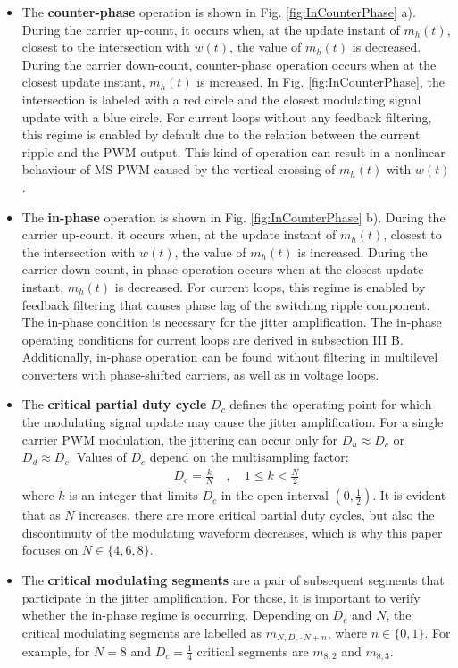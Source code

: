 \documentclass[journal]{IEEEtran}
\begin{document}
\noindent
\begin{itemize}
\item{The \textbf{counter-phase} operation is shown in Fig. \ref{fig:InCounterPhase} a). During the carrier up-count, it occurs when, at the update instant of $m_h(t)$, closest to the intersection with $w(t)$, the value of $m_h(t)$ is decreased. During the carrier down-count, counter-phase operation occurs when at the closest update instant, $m_h(t)$ is increased. In Fig. \ref{fig:InCounterPhase}, the intersection is labeled with a red circle and the closest modulating signal update with a blue circle. 
For current loops without any feedback filtering, this regime is enabled by default due to the relation between the current ripple and the PWM output. This kind of operation can result in a nonlinear behaviour of MS-PWM caused by the vertical crossing of $m_h(t)$ with $w(t)$.}

\item{The \textbf{in-phase} operation is shown in Fig. \ref{fig:InCounterPhase} b). During the carrier up-count, it occurs when, at the update instant of $m_h(t)$, closest to the intersection with $w(t)$, the value of $m_h(t)$ is increased. During the carrier down-count, in-phase operation occurs when at the closest update instant, $m_h(t)$ is decreased. For current loops, this regime is enabled by feedback filtering that causes phase lag of the switching ripple component. The in-phase condition is necessary for the jitter amplification. The in-phase operating conditions for current loops are derived in subsection III B. Additionally, in-phase operation can be found without filtering in multilevel converters with phase-shifted carriers, as well as in voltage loops.}

\item{The \textbf{critical partial duty cycle} $D_c$ defines the operating point for which the modulating signal update may cause the jitter amplification. 
For a single carrier PWM modulation, the jittering can occur only for $D_u \approx D_c$ or $D_d \approx D_c$. Values of $D_c$ depend on the multisampling factor:
\begin{equation}
\begin{aligned}
D_c = \frac{k}{N} \quad , \quad 1 \leq k < \frac{N}{2} \label{eq:duty_crit} 
\end{aligned}    
\end{equation}
where $k$ is an integer that limits $D_c$ in the open interval $\left(0,\frac{1}{2} \right)$. 
It is evident that as $N$ increases, there are more critical partial duty cycles, but also the discontinuity of the modulating waveform decreases, which is why this paper focuses on $N \in \{ 4,6,8 \}$.}

\item{The \textbf{critical modulating segments} are a pair of subsequent segments that participate in the jitter amplification. For those, it is important to verify whether the in-phase regime is occurring. Depending on $D_c$ and $N$, the critical modulating segments are labelled as $m_{N , D_c \cdot N + n}$, where $n \in \{ 0,1 \}$. For example, for $N = 8$ and $D_c = \frac{1}{4}$ critical segments are $m_{8,2}$ and $m_{8,3}$}.
\end{itemize}
\end{document}
